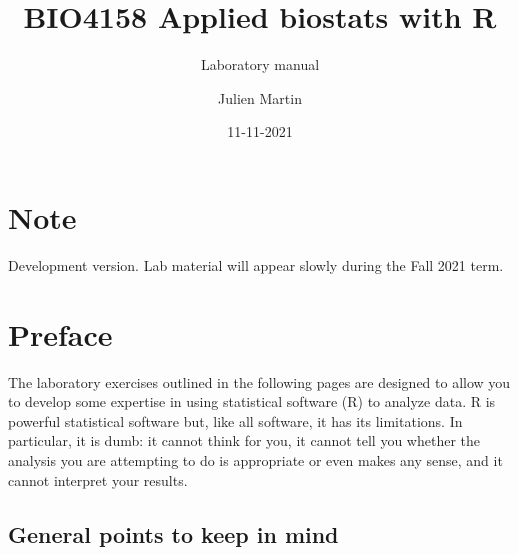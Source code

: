 \documentclass[
  12pt,
]{book}
\title{BIO4158 Applied biostats with R}
\subtitle{Laboratory manual}
\author{Julien Martin}
\date{11-11-2021}
\begin{document}
\maketitle



{
\setcounter{tocdepth}{1}
\tableofcontents
}
\hypertarget{note}{%
\chapter*{Note}\label{note}}

Development version. Lab material will appear slowly during the Fall 2021 term.

\hypertarget{preface}{%
\chapter*{Preface}\label{preface}}

The laboratory exercises outlined in the following pages are designed to allow you to develop some expertise in using statistical software (R)
to analyze data. R is powerful statistical software but, like all software, it has its limitations. In particular, it is dumb: it cannot think for you,
it cannot tell you whether the analysis you are attempting to do is appropriate or even makes any sense, and it cannot interpret your
results.

\hypertarget{general-points-to-keep-in-mind}{%
\section*{General points to keep in mind}\label{general-points-to-keep-in-mind}}
\end{document}
